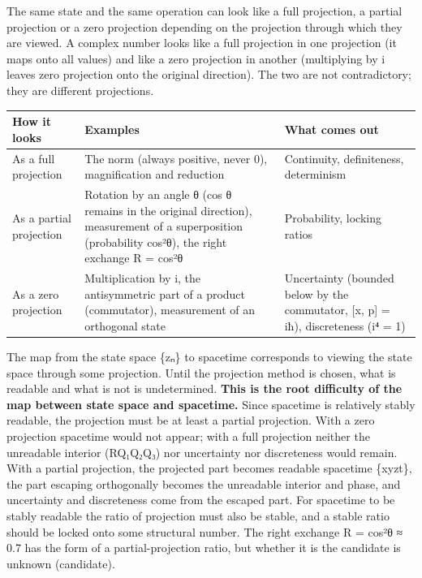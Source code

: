 \documentclass[
  a4paper,
]{article}
\newcounter{none} %
\begin{document}
The same state and the same operation can look like a full projection, a
partial projection or a zero projection depending on the projection
through which they are viewed. A complex number looks like a full
projection in one projection (it maps onto all values) and like a zero
projection in another (multiplying by i leaves zero projection onto the
original direction). The two are not contradictory; they are different
projections.

{\def\LTcaptype{none} %
\begin{longtable}[]{@{}
  >{\raggedright\arraybackslash}p{}
  >{\raggedright\arraybackslash}p{}
  >{\raggedright\arraybackslash}p{}@{}}
\toprule\noalign{}
\begin{minipage}[b]{\linewidth}\raggedright
How it looks
\end{minipage} & \begin{minipage}[b]{\linewidth}\raggedright
Examples
\end{minipage} & \begin{minipage}[b]{\linewidth}\raggedright
What comes out
\end{minipage} \\
\midrule\noalign{}
\endhead
\bottomrule\noalign{}
\endlastfoot
As a full projection & The norm (always positive, never 0),
magnification and reduction & Continuity, definiteness, determinism \\
As a partial projection & Rotation by an angle θ (cos θ remains in the
original direction), measurement of a superposition (probability cos²θ),
the right exchange R = cos²θ & Probability, locking ratios \\
As a zero projection & Multiplication by i, the antisymmetric part of a
product (commutator), measurement of an orthogonal state & Uncertainty
(bounded below by the commutator, {[}x, p{]} = iħ), discreteness (i⁴ =
1) \\
\end{longtable}
}

The map from the state space \{zₙ\} to spacetime corresponds to viewing
the state space through some projection. Until the projection method is
chosen, what is readable and what is not is undetermined. \textbf{This
is the root difficulty of the map between state space and spacetime.}
Since spacetime is relatively stably readable, the projection must be at
least a partial projection. With a zero projection spacetime would not
appear; with a full projection neither the unreadable interior (RQ₁Q₂Q₃)
nor uncertainty nor discreteness would remain. With a partial
projection, the projected part becomes readable spacetime \{xyzt\}, the
part escaping orthogonally becomes the unreadable interior and phase,
and uncertainty and discreteness come from the escaped part. For
spacetime to be stably readable the ratio of projection must also be
stable, and a stable ratio should be locked onto some structural number.
The right exchange R = cos²θ ≈ 0.7 has the form of a partial-projection
ratio, but whether it is the candidate is unknown (candidate).
\end{document}

